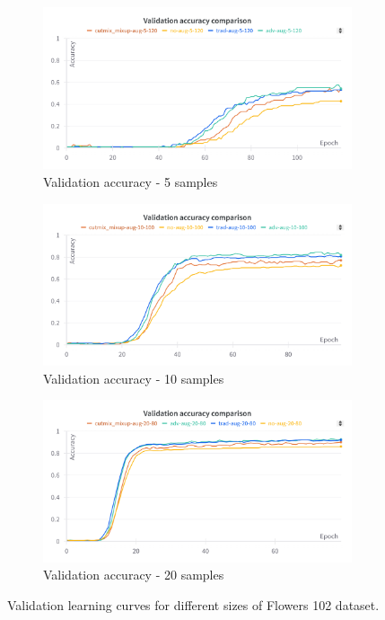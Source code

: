\begin{figure}[!h]
    \centering

    \begin{subfigure}[b]{0.77\textwidth}
        \centering
        \includegraphics[width=\textwidth]{Images/oneshot/lc/val_acc_5.png}
        \caption{Validation accuracy - 5 samples}
    \end{subfigure}


    \begin{subfigure}[b]{0.77\textwidth}
        \centering
        \includegraphics[width=\textwidth]{Images/oneshot/lc/val_acc_10.png}
        \caption{Validation accuracy - 10 samples}
    \end{subfigure}

    \begin{subfigure}[b]{0.77\textwidth}
        \centering
        \includegraphics[width=\textwidth]{Images/oneshot/lc/val_acc_20.png}
        \caption{Validation accuracy - 20 samples}
    \end{subfigure}
    \caption{Validation learning curves for different sizes of Flowers 102 dataset.}
    \label{fig:oneshotLCsVal}
   
\end{figure}

